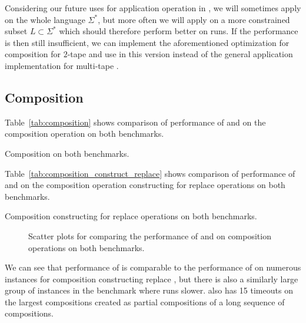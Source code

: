 Considering our future uses for application operation in \noodler, we will sometimes apply on the whole language $\Sigma^*$, but more often we will apply on a more constrained subset $L \subset \Sigma^*$ which should therefore perform better on \noodler runs.
If the performance is then still insufficient, we can implement the aforementioned optimization for composition for $2$-tape \nfts and use in \noodler this version instead of the general application implementation for multi-tape \nfts.

\subsection{Composition}

Table~\ref{tab:composition} shows comparison of performance of \mata and \mona on the composition operation on both benchmarks.

\begin{table}[ht]
  \centering
  
  \caption{
    Composition on both benchmarks.
  }
  \label{tab:composition}
\end{table}

Table~\ref{tab:composition_construct_replace} shows comparison of performance of \mata and \mona on the composition operation constructing \nfts for replace operations on both benchmarks.

\begin{table}[ht]
  \centering
  
  \caption{
    Composition constructing \nfts for replace operations on both benchmarks.
  }
  \label{tab:composition_construct_replace}
\end{table}

\begin{figure}[ht]
    \centering
    \quad
    \caption{
      Scatter plots for comparing the performance of \mata and \mona on composition operations on both benchmarks.
    }
    \label{fig:composition}%
\end{figure}

We can see that performance of \mata is comparable to the performance of \mona on numerous instances for composition constructing replace \nfts, but there is also a similarly large group of instances in the \transducerPlus benchmark where \mata runs slower.
\mata also has 15 timeouts on the largest compositions created as partial compositions of a long sequence of compositions.

